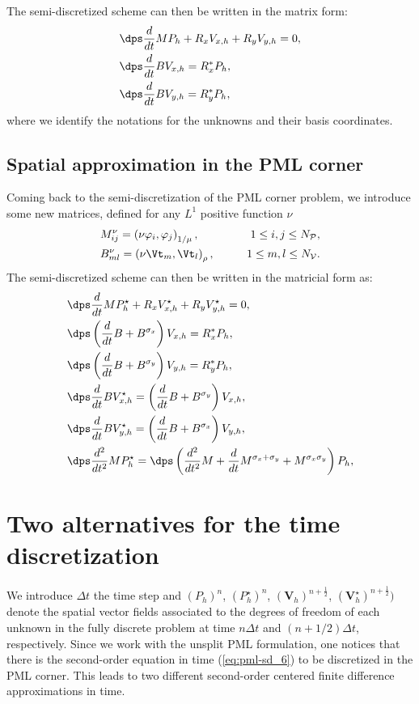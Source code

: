 \documentclass[a4paper]{article}
\def\bV{\boldsymbol{V}}
\def\bVs{\boldsymbol{V}^{\star}}
\def\Vs{V^{\star}}
\def\Ps{P^{\star}}
\begin{document}
The semi-discretized scheme can then be written in the matrix form:
\begin{align}
&\dps \frac{d}{dt} M P_h  +
R_{x}V_{x,h}+R_{y}V_{y,h} =0 , \label{sd-mat-1}\\
&
\dps \frac{d}{dt}BV_{x,h}=R_{x}^{*}P_{h},\\
&
\dps \frac{d}{dt}BV_{y,h}=R_{y}^{*}P_{h},\label{sd-mat-3}
\end{align}
where we identify the notations for the unknowns and their basis 
coordinates. 

\subsection{Spatial approximation in the PML corner}
Coming back to the semi-discretization of the PML corner problem, we
introduce some new matrices, defined for any $L^1$ positive function $\nu$
\begin{eqnarray*}
&M^{\nu}_{ij}=\left( \nu\varphi_{i},\varphi_{j}\right)_{1/\mu},&\qquad 1\le i,j\le N_{\cal P},\\
&B^{\nu}_{ml}=\left( \nu \Vt_{m},\Vt_{l}\right)_{\rho},&\qquad 1\le m,l\le N_{\cal V}.
\end{eqnarray*}
The semi-discretized scheme can then be written in the matricial form
as:
\begin{align}
&\dps \frac{d}{dt} M\Ps_{h} + R_{x}\Vs_{x,h}+R_{y}\Vs_{y,h}=0 ,\label{eq:pml-sd_1}\\
 &\dps \left(\frac{d}{dt}   B + B^{\sigma_x}\right)  V_{x,h}  =R_{x}^{*}P_{h},\\
 &\dps \left(\frac{d}{dt}  B  +  B^{\sigma_y}\right) V_{y,h} =R_{y}^{*}P_{h},\\
&\dps \frac{d}{dt} B\Vs_{x,h}= \left(\frac{d}{dt} B  + B^{\sigma_y}\right)V_{x,h},\\
&\dps \frac{d}{dt}B\Vs_{y,h}=\left(\frac{d}{dt}B  + B^{\sigma_x}\right)V_{y,h},\\
&\dps \frac{d^2}{dt^2} M\Ps_{h}= 
 \dps \left(\frac{d^2}{dt^2}  M + \frac{d}{dt} M^{\sigma_x+\sigma_y}+ 
  M^{\sigma_x \sigma_y}\right)    P_{h},\label{eq:pml-sd_6}
\end{align}

\section{Two alternatives for the time discretization}
\label{sec:approx-time}
We introduce $\Delta t$ the time step and $(P_{h})^{n}$,
$(\Ps_{h})^{n}$, $(\bV_{h})^{n+\frac12}$, $(\bVs_{h})^{n+\frac12})$ 
denote the spatial vector fields associated to the degrees of freedom of 
each unknown in the fully discrete problem at time $n\Delta t$ and 
$(n+1/2)\Delta t$, respectively. Since we work with the unsplit PML 
formulation, one notices that there is the second-order equation in time 
(\ref{eq:pml-sd_6}) to be discretized in the PML corner. This leads to %
two different second-order centered finite difference 
approximations in time. 
\end{document}
